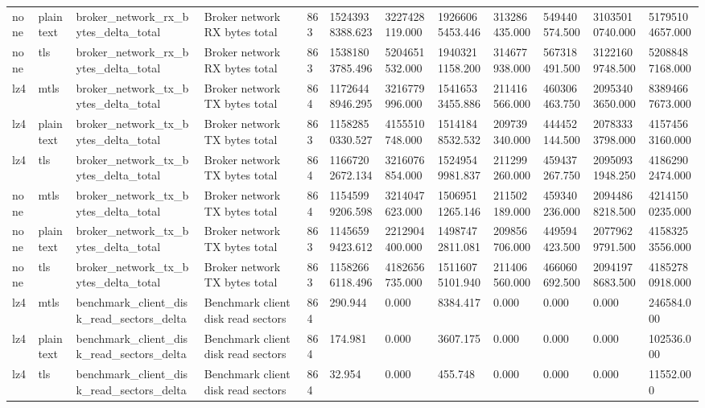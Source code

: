 \begin{longtable}{llllllllllll}
none & plaintext & broker\_network\_rx\_bytes\_delta\_total & Broker network RX bytes total & 863 & 15243938388.623 & 3227428119.000 & 19266065453.446 & 313286435.000 & 549440574.500 & 31035010740.000 & 51795104657.000 \\
none & tls & broker\_network\_rx\_bytes\_delta\_total & Broker network RX bytes total & 863 & 15381803785.496 & 5204651532.000 & 19403211158.200 & 314677938.000 & 567318491.500 & 31221609748.500 & 52088487168.000 \\
lz4 & mtls & broker\_network\_tx\_bytes\_delta\_total & Broker network TX bytes total & 864 & 11726448946.295 & 3216779996.000 & 15416533455.886 & 211416566.000 & 460306463.750 & 20953403650.000 & 83894667673.000 \\
lz4 & plaintext & broker\_network\_tx\_bytes\_delta\_total & Broker network TX bytes total & 863 & 11582850330.527 & 4155510748.000 & 15141848532.532 & 209739340.000 & 444452144.500 & 20783333798.000 & 41574563160.000 \\
lz4 & tls & broker\_network\_tx\_bytes\_delta\_total & Broker network TX bytes total & 864 & 11667202672.134 & 3216076854.000 & 15249549981.837 & 211299260.000 & 459437267.750 & 20950931948.250 & 41862902474.000 \\
none & mtls & broker\_network\_tx\_bytes\_delta\_total & Broker network TX bytes total & 864 & 11545999206.598 & 3214047623.000 & 15069511265.146 & 211502189.000 & 459340236.000 & 20944868218.500 & 42141500235.000 \\
none & plaintext & broker\_network\_tx\_bytes\_delta\_total & Broker network TX bytes total & 863 & 11456599423.612 & 2212904400.000 & 14987472811.081 & 209856706.000 & 449594423.500 & 20779629791.500 & 41583253556.000 \\
none & tls & broker\_network\_tx\_bytes\_delta\_total & Broker network TX bytes total & 863 & 11582666118.496 & 4182656735.000 & 15116075101.940 & 211406560.000 & 466060692.500 & 20941978683.500 & 41852780918.000 \\
lz4 & mtls & benchmark\_client\_disk\_read\_sectors\_delta & Benchmark client disk read sectors & 864 & 290.944 & 0.000 & 8384.417 & 0.000 & 0.000 & 0.000 & 246584.000 \\
lz4 & plaintext & benchmark\_client\_disk\_read\_sectors\_delta & Benchmark client disk read sectors & 864 & 174.981 & 0.000 & 3607.175 & 0.000 & 0.000 & 0.000 & 102536.000 \\
lz4 & tls & benchmark\_client\_disk\_read\_sectors\_delta & Benchmark client disk read sectors & 864 & 32.954 & 0.000 & 455.748 & 0.000 & 0.000 & 0.000 & 11552.000 \\

\end{longtable}
